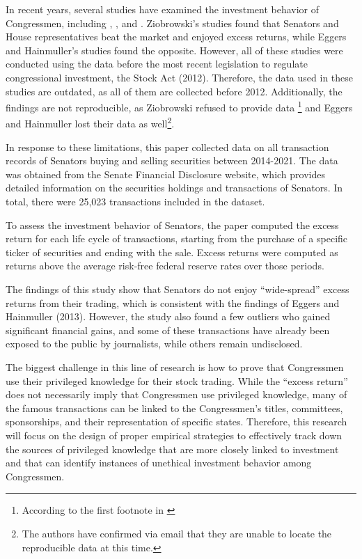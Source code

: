 \documentclass[12pt,letterpaper]{article}
\begin{document}
In recent years, several studies have examined the investment behavior of Congressmen, including \cite{zi24}, \cite{zi11} \cite{eg13}, and \cite{eg14}. Ziobrowski's studies found that Senators and House representatives beat the market and enjoyed excess returns, while Eggers and Hainmuller's studies found the opposite. However, all of these studies were conducted using the data before the most recent legislation to regulate congressional investment, the Stock Act (2012).
Therefore, the data used in these studies are outdated, as all of them are collected before 2012. Additionally, the findings are not reproducible, as Ziobrowski refused to provide data \footnote{According to the first footnote in \cite{eg13}} and Eggers and Hainmuller lost their data as well\footnote{The authors have confirmed via email that they are unable to locate the reproducible data at this time.
}.

In response to these limitations, this paper collected data on all transaction records of Senators buying and selling securities between 2014-2021. The data was obtained from the Senate Financial Disclosure website, which provides detailed information on the securities holdings and transactions of Senators. In total, there were 25,023 transactions included in the dataset.

To assess the investment behavior of Senators, the paper computed the excess return for each life cycle of transactions, starting from the purchase of a specific ticker of securities and ending with the sale. Excess returns were computed as returns above the average risk-free federal reserve rates over those periods.

The findings of this study show that Senators do not enjoy ``wide-spread'' excess returns from their trading, which is consistent with the findings of Eggers and Hainmuller (2013). However, the study also found a few outliers who gained significant financial gains, and some of these transactions have already been exposed to the public by journalists, while others remain undisclosed.

The biggest challenge in this line of research is how to prove that Congressmen use their privileged knowledge for their stock trading. While the ``excess return'' does not necessarily imply that Congressmen use privileged knowledge, many of the famous transactions can be linked to the Congressmen's titles, committees, sponsorships, and their representation of specific states. Therefore, this research will focus on the design of proper empirical strategies to effectively track down the sources of privileged knowledge that are more closely linked to investment and that can identify instances of unethical investment behavior among Congressmen.
\end{document}
